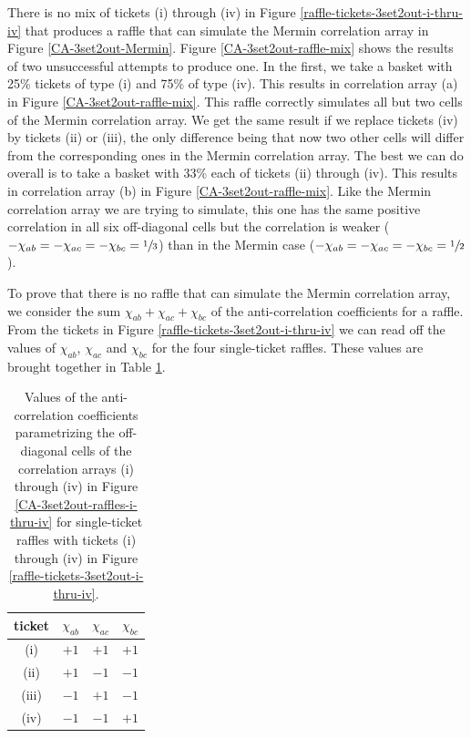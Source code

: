 There is no mix of tickets (i) through (iv) in Figure \ref{raffle-tickets-3set2out-i-thru-iv} that produces a raffle that can simulate the Mermin correlation array in Figure \ref{CA-3set2out-Mermin}. Figure \ref{CA-3set2out-raffle-mix} shows the results of two unsuccessful attempts to produce one. In the first, we take a basket with 25\% tickets of type (i) and 75\% of type (iv). This results in correlation array (a) in Figure \ref{CA-3set2out-raffle-mix}. This raffle correctly simulates all but two cells of the Mermin correlation array. We get the same result if we replace tickets (iv) by tickets (ii) or (iii), the only difference being that now two other cells will differ from the corresponding ones in the Mermin correlation array. The best we can do overall is to take a basket with 33\% each of tickets (ii) through (iv). This results in correlation array (b) in Figure \ref{CA-3set2out-raffle-mix}. Like the Mermin correlation array we are trying to simulate, this one has the same positive correlation in all six off-diagonal cells but the correlation is weaker ($-\chi_{ab} = -\chi_{ac} = -\chi_{bc}  = \sfrac13$) than in the Mermin case ($-\chi_{ab} =-\chi_{ac}  = -\chi_{bc}  = \sfrac12$).

To prove that there is no raffle that can simulate the Mermin correlation array, we consider the sum $\chi_{ab} + \chi_{ac} + \chi_{bc}$ of the anti-correlation coefficients for a raffle. From the tickets in Figure \ref{raffle-tickets-3set2out-i-thru-iv} we can read off the values of $\chi_{ab}$, $\chi_{ac}$ and $\chi_{bc}$ for the four single-ticket raffles. These values are brought together in Table \ref{values of chi}. 

\begin{table}[ht]
\centering
\begin{tabular}{|c||c|c|c|}
\hline
ticket & \quad $\chi_{ab}$ \quad & \quad $\chi_{ac}$ \quad & \quad $\chi_{bc}$ \quad \\[.1cm] 
\hline
 (i) & $+1$ & $+1$ & $+1$ \\[.2cm]
 (ii) & $+1$ & $-1$ & $-1$ \\[.2cm]
 (iii) & $-1$ & $+1$ & $-1$ \\[.2cm]
(iv) & $-1$ & $-1$ & $+1$ \\
 \hline
\end{tabular}
\caption{Values of the anti-correlation coefficients parametrizing the off-diagonal cells of the correlation arrays (i) through (iv) in Figure \ref{CA-3set2out-raffles-i-thru-iv} for single-ticket raffles with tickets (i) through (iv) in Figure \ref{raffle-tickets-3set2out-i-thru-iv}.}
\label{values of chi}
\end{table} 

